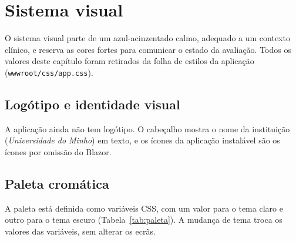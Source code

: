 \chapter{Sistema visual}
\label{cap:visual}

O sistema visual parte de um azul-acinzentado calmo, adequado a um contexto clínico, e reserva as cores fortes para comunicar o estado da avaliação. Todos os valores deste capítulo foram retirados da folha de estilos da aplicação (\texttt{wwwroot/css/app.css}).

\section{Logótipo e identidade visual}

A aplicação ainda não tem logótipo. O cabeçalho mostra o nome da instituição (\emph{Universidade do Minho}) em texto, e os ícones da aplicação instalável são os ícones por omissão do Blazor.


\section{Paleta cromática}

A paleta está definida como variáveis CSS, com um valor para o tema claro e outro para o tema escuro (Tabela~\ref{tab:paleta}). A mudança de tema troca os valores das variáveis, sem alterar os ecrãs.

